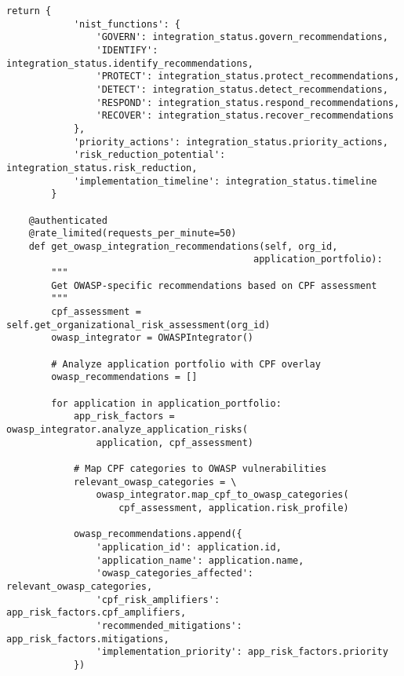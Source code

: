 \documentclass[10pt,twocolumn]{IEEEtran}
\begin{document}
\begin{lstlisting}[caption={Enterprise Integration API Specification}]
        return {
            'nist_functions': {
                'GOVERN': integration_status.govern_recommendations,
                'IDENTIFY': integration_status.identify_recommendations,
                'PROTECT': integration_status.protect_recommendations,
                'DETECT': integration_status.detect_recommendations,
                'RESPOND': integration_status.respond_recommendations,
                'RECOVER': integration_status.recover_recommendations
            },
            'priority_actions': integration_status.priority_actions,
            'risk_reduction_potential': integration_status.risk_reduction,
            'implementation_timeline': integration_status.timeline
        }
    
    @authenticated
    @rate_limited(requests_per_minute=50)
    def get_owasp_integration_recommendations(self, org_id, 
                                            application_portfolio):
        """
        Get OWASP-specific recommendations based on CPF assessment
        """
        cpf_assessment = self.get_organizational_risk_assessment(org_id)
        owasp_integrator = OWASPIntegrator()
        
        # Analyze application portfolio with CPF overlay
        owasp_recommendations = []
        
        for application in application_portfolio:
            app_risk_factors = owasp_integrator.analyze_application_risks(
                application, cpf_assessment)
            
            # Map CPF categories to OWASP vulnerabilities
            relevant_owasp_categories = \
                owasp_integrator.map_cpf_to_owasp_categories(
                    cpf_assessment, application.risk_profile)
            
            owasp_recommendations.append({
                'application_id': application.id,
                'application_name': application.name,
                'owasp_categories_affected': relevant_owasp_categories,
                'cpf_risk_amplifiers': app_risk_factors.cpf_amplifiers,
                'recommended_mitigations': app_risk_factors.mitigations,
                'implementation_priority': app_risk_factors.priority
            })
        

\end{lstlisting}
\end{document}
